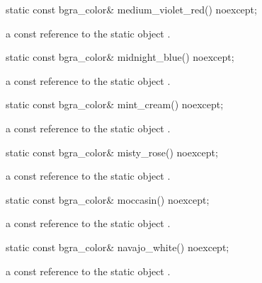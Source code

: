 \begin{itemdecl}
static const bgra_color& medium_violet_red() noexcept;
\end{itemdecl}
\begin{itemdescr}
\pnum
\returns
a const reference to the static  object .
\end{itemdescr}

\begin{itemdecl}
static const bgra_color& midnight_blue() noexcept;
\end{itemdecl}
\begin{itemdescr}
\pnum
\returns
a const reference to the static  object .
\end{itemdescr}

\begin{itemdecl}
static const bgra_color& mint_cream() noexcept;
\end{itemdecl}
\begin{itemdescr}
\pnum
\returns
a const reference to the static  object .
\end{itemdescr}

\begin{itemdecl}
static const bgra_color& misty_rose() noexcept;
\end{itemdecl}
\begin{itemdescr}
\pnum
\returns
a const reference to the static  object .
\end{itemdescr}

\begin{itemdecl}
static const bgra_color& moccasin() noexcept;
\end{itemdecl}
\begin{itemdescr}
\pnum
\returns
a const reference to the static  object .
\end{itemdescr}

\begin{itemdecl}
static const bgra_color& navajo_white() noexcept;
\end{itemdecl}
\begin{itemdescr}
\pnum
\returns
a const reference to the static  object .
\end{itemdescr}

